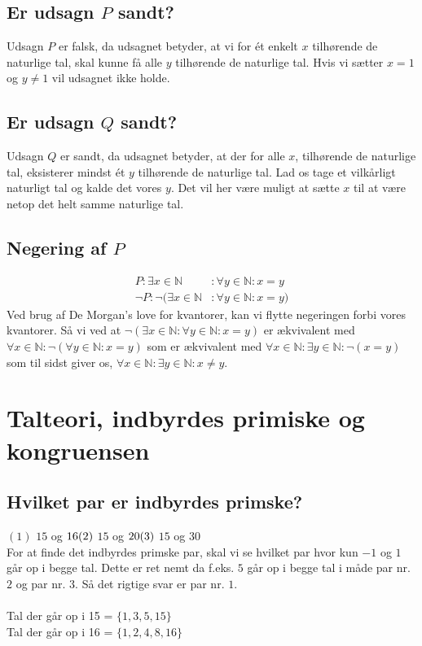 \documentclass[a4paper,10pt]{article}
\newcommand{\N}{\mathbb{N}}
\begin{document}
\subsection*{Er udsagn $P$ sandt?}
Udsagn $P$ er falsk, da udsagnet betyder, at vi for ét enkelt $x$ tilhørende de naturlige tal, skal kunne få alle $y$ tilhørende de naturlige tal. Hvis vi sætter $x = 1$ og $y\neq 1$ vil udsagnet ikke holde.
\subsection*{Er udsagn $Q$ sandt?}
Udsagn $Q$ er sandt, da udsagnet betyder, at der for alle $x$, tilhørende de naturlige tal, eksisterer mindst ét $y$ tilhørende de naturlige tal. Lad os tage et vilkårligt naturligt tal og kalde det vores $y$. Det vil her være muligt at sætte $x$ til at være netop det helt samme naturlige tal.
\subsection*{Negering af $P$}
\begin{align*}
P:\exists x \in \N &: \forall y \in \N: x=y\\
\neg P:\neg (\exists x \in \N &: \forall y \in \N: x=y)
\end{align*}
Ved brug af De Morgan's love for kvantorer, kan vi flytte negeringen forbi vores kvantorer. Så vi ved at $\neg (\exists x \in \N : \forall y \in \N: x=y)$ er ækvivalent med $\forall x \in \N : \neg (\forall y \in \N: x=y)$ som er ækvivalent med $\forall x \in \N : \exists y \in \N: \neg(x=y)$ som til sidst giver os, $\forall x \in \N : \exists y \in \N: x\neq y$.
\section{Talteori, indbyrdes primiske og kongruensen}
\subsection*{Hvilket par er indbyrdes primske?}
$(1)$ $15$ og $16\\
(2)$ $15$ og $20\\
(3)$ $15$ og $30$\\
For at finde det indbyrdes primske par, skal vi se hvilket par hvor kun $-1$ og $1$ går op i begge tal. Dette er ret nemt da f.eks. $5$ går op i begge tal i måde par nr. $2$ og par nr. $3$. Så det rigtige svar er par nr. $1$.\\\\
Tal der går op i 15 = $\{1,3,5,15\}$\\
Tal der går op i 16 = $\{1,2,4,8,16\}$
\end{document}
